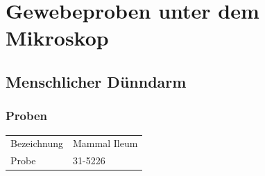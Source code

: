 \section{Gewebeproben unter dem Mikroskop}

\newpage
\subsection{Menschlicher Dünndarm}

\subsubsection{Proben}
\begin{table}[h!]
	\centering
	\begin{tabular}{l l}
		Bezeichnung	& Mammal Ileum \\
		Probe 		& 31-5226
	\end{tabular}
\end{table}

